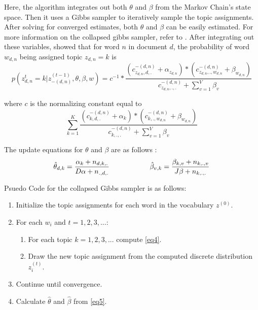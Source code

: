 \documentclass[12pt]{report}
\begin{document}
\begin{flushleft}
Here, the algorithm integrates out both $\theta$ and $\beta$ from the Markov Chain's state space. Then it uses a Gibbs sampler to iteratively sample the topic assignments. After solving for converged estimates, both $\theta$ and $\beta$ can be easily estimated. For more information on the collapsed gibbs sampler, refer to \cite{CGSTheory}. After integrating out these variables, \cite{multinom} showed that for word $n$ in document $d$, the probability of word $w_{d,n}$ being assigned topic $z_{d,n}=k$ is 
\begin{equation} \label{eq4}
p( z^{t}_{d,n}=k| z^{(t-1)}_{-(d,n)}, \theta, \beta, w) =c^{-1}*\frac{(c^{-(d,n)}_{z_{d,n},d,.}+\alpha_{z_{d,n}})*(c^{-(d,n)}_{z_{d,n},.,w_{d,n}}+\beta_{w_{d,n}})}{c^{-(d,n)}_{z_{d,n},.,.}+\sum_{v=1}^{V}{\beta_{v}}} 
\end{equation}

\noindent where $c$ is the normalizing constant equal to 
$$
\sum_{k=1}^{K}{\frac{(c^{-(d,n)}_{k,d,.}+\alpha_{k})*(c^{-(d,n)}_{k,.,w_{d,n}}+\beta_{w_{d,n}})}{c^{-(d,n)}_{k,.,.}+\sum_{v=1}^{V}{\beta_{v}}}} 
$$

\noindent The update equations for $\theta$ and $\beta$ are as follows \cite{multinom}: 
\begin{equation} \label{eq5}
\hat{\theta}_{d,k}=\frac{\alpha_{k}+n_{d,k,.}}{D\alpha+n_{.,d,.}} \hspace{20mm} \hat{\beta}_{v,k}=\frac{\beta_{k,v}+n_{k,.,v}}{J\beta+n_{k,.,.}}
\end{equation}

Psuedo Code for the collapsed Gibbs sampler is as follows:
\begin{enumerate}
	\item Initialize the topic assignments for each word in the vocabulary $z^{(0)}$.
	\item For each $w_{i}$ and $t=1,2,3,...$: 
	\begin{enumerate}
		\item For each topic $k=1,2,3,...$ compute \ref{eq4}.
		\item Draw the new topic assignment from the computed discrete distribution $z^{(t)}_{i}$.
	\end{enumerate}
	\item Continue until convergence.
	\item Calculate $\hat{\theta}$ and $\hat{\beta}$ from \ref{eq5}.
\end{enumerate}


\end{flushleft}
\end{document}
